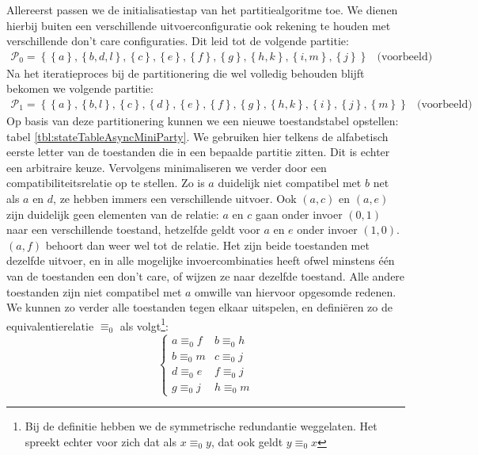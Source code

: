 Allereerst passen we de initialisatiestap van het partitiealgoritme toe. We dienen hierbij buiten een verschillende uitvoerconfiguratie ook rekening te houden met verschillende don't care configuraties. Dit leid tot de volgende partitie:
\begin{equation}
\begin{array}{lr}
\mathcal{P}_0=\left\{\left\{a\right\},\left\{b,d,l\right\},\left\{c\right\},\left\{e\right\},\left\{f\right\},\left\{g\right\},\left\{h,k\right\},\left\{i,m\right\},\left\{j\right\}\right\}&\mbox{(voorbeeld)}
\end{array}
\end{equation}
Na het iteratieproces bij de partitionering die wel volledig behouden blijft bekomen we volgende partitie:
\begin{equation}
\begin{array}{lr}
\mathcal{P}_1=\left\{\left\{a\right\},\left\{b,l\right\},\left\{c\right\},\left\{d\right\},\left\{e\right\},\left\{f\right\},\left\{g\right\},\left\{h,k\right\},\left\{i\right\},\left\{j\right\},\left\{m\right\}\right\}&\mbox{(voorbeeld)}
\end{array}
\end{equation}
Op basis van deze partitionering kunnen we een nieuwe toestandstabel opstellen: tabel \ref{tbl:stateTableAsyncMiniParty}. We gebruiken hier telkens de alfabetisch eerste letter van de toestanden die in een bepaalde partitie zitten. Dit is echter een arbitraire keuze. Vervolgens minimaliseren we verder door een compatibiliteitsrelatie op te stellen. Zo is $a$ duidelijk niet compatibel met $b$ net als $a$ en $d$, ze hebben immers een verschillende uitvoer. Ook $\left(a,c\right)$ en $\left(a,e\right)$ zijn duidelijk geen elementen van de relatie: $a$ en $c$ gaan onder invoer $\left(0,1\right)$ naar een verschillende toestand, hetzelfde geldt voor $a$ en $e$ onder invoer $\left(1,0\right)$. $\left(a,f\right)$ behoort dan weer wel tot de relatie. Het zijn beide toestanden met dezelfde uitvoer, en in alle mogelijke invoercombinaties heeft ofwel minstens \'e\'en van de toestanden een don't care, of wijzen ze naar dezelfde toestand. Alle andere toestanden zijn niet compatibel met $a$ omwille van hiervoor opgesomde redenen. We kunnen zo verder alle toestanden tegen elkaar uitspelen, en defini\"eren zo de equivalentierelatie $\equiv_0$ als volgt\footnote{Bij de definitie hebben we de symmetrische redundantie weggelaten. Het spreekt echter voor zich dat als $x\equiv_0y$, dat ook geldt $y\equiv_0x$}:
\begin{equation}
\left\{\begin{array}{cc}
a\equiv_0f&b\equiv_0h\\
b\equiv_0m&c\equiv_0j\\
d\equiv_0e&f\equiv_0j\\
g\equiv_0j&h\equiv_0m
\end{array}\right.
\end{equation}
